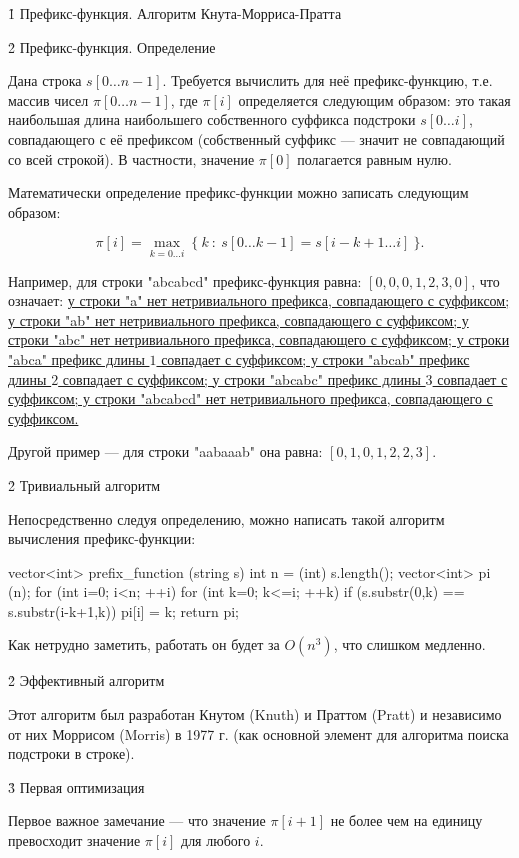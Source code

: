 \h1{ Префикс-функция. Алгоритм Кнута-Морриса-Пратта }


\h2{ Префикс-функция. Определение }

Дана строка $s[0 \ldots n-1]$. Требуется вычислить для неё префикс-функцию, т.е. массив чисел $\pi[0 \ldots n-1]$, где $\pi[i]$ определяется следующим образом: это такая наибольшая длина наибольшего собственного суффикса подстроки $s[0 \ldots i]$, совпадающего с её префиксом (собственный суффикс --- значит не совпадающий со всей строкой). В частности, значение $\pi[0]$ полагается равным нулю.

Математически определение префикс-функции можно записать следующим образом:

$$ \pi[i] = \max_{k=0 \ldots i} ~ \{ ~ k ~ : ~ s[0 \ldots k-1] = s[i-k+1 \ldots i] ~ \}. $$

Например, для строки "abcabcd" префикс-функция равна: $[0, 0, 0, 1, 2, 3, 0]$, что означает:
\ul{
\li у строки "a" нет нетривиального префикса, совпадающего с суффиксом;
\li у строки "ab" нет нетривиального префикса, совпадающего с суффиксом;
\li у строки "abc" нет нетривиального префикса, совпадающего с суффиксом;
\li у строки "abca" префикс длины $1$ совпадает с суффиксом;
\li у строки "abcab" префикс длины $2$ совпадает с суффиксом;
\li у строки "abcabc" префикс длины $3$ совпадает с суффиксом;
\li у строки "abcabcd" нет нетривиального префикса, совпадающего с суффиксом.
}

Другой пример --- для строки "aabaaab" она равна: $[0, 1, 0, 1, 2, 2, 3]$.


\h2{ Тривиальный алгоритм }

Непосредственно следуя определению, можно написать такой алгоритм вычисления префикс-функции:

\code
vector<int> prefix_function (string s) {
	int n = (int) s.length();
	vector<int> pi (n);
	for (int i=0; i<n; ++i)
		for (int k=0; k<=i; ++k)
			if (s.substr(0,k) == s.substr(i-k+1,k))
				pi[i] = k;
	return pi;
}
\endcode

Как нетрудно заметить, работать он будет за $O(n^3)$, что слишком медленно.


\h2{ Эффективный алгоритм }

Этот алгоритм был разработан Кнутом (Knuth) и Праттом (Pratt) и независимо от них Моррисом (Morris) в 1977 г. (как основной элемент для алгоритма поиска подстроки в строке).

\h3{ Первая оптимизация }

Первое важное замечание --- что значение $\pi[i+1]$ не более чем на единицу превосходит значение $\pi[i]$ для любого $i$.

